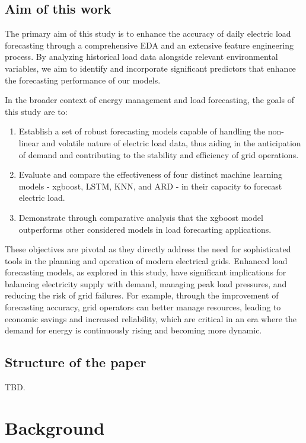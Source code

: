 \documentclass{article} %
\begin{document}
\subsection{Aim of this work}
The primary aim of this study is to enhance the accuracy of daily electric load forecasting through a comprehensive \gls{EDA} and an extensive feature engineering process. By analyzing historical load data alongside relevant environmental variables, we aim to identify and incorporate significant predictors that enhance the forecasting performance of our models.

In the broader context of energy management and load forecasting, the goals of this study are to:

\begin{enumerate}
    \item Establish a set of robust forecasting models capable of handling the non-linear and volatile nature of electric load data, thus aiding in the anticipation of demand and contributing to the stability and efficiency of grid operations.
    \item Evaluate and compare the effectiveness of four distinct machine learning models - \gls{xgboost}, \gls{LSTM}, \gls{KNN}, and \gls{ARD} - in their capacity to forecast electric load.
    \item Demonstrate through comparative analysis that the \gls{xgboost} model outperforms other considered models in load forecasting applications.
\end{enumerate}

These objectives are pivotal as they directly address the need for sophisticated tools in the planning and operation of modern electrical grids. Enhanced load forecasting models, as explored in this study, have significant implications for balancing electricity supply with demand, managing peak load pressures, and reducing the risk of grid failures. For example, through the improvement of forecasting accuracy, grid operators can better manage resources, leading to economic savings and increased reliability, which are critical in an era where the demand for energy is continuously rising and becoming more dynamic.


\subsection{Structure of the paper}
 TBD.



\section{Background}
\end{document}

